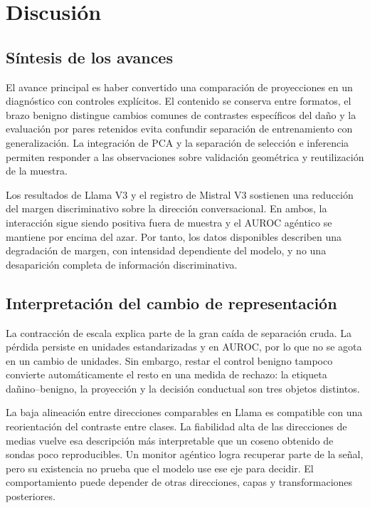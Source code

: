 \chapter{Discusión}
\label{chap:discusion}
\section{Síntesis de los avances}

El avance principal es haber convertido una comparación de proyecciones en un diagnóstico con controles explícitos. El contenido se conserva entre formatos, el brazo benigno distingue cambios comunes de contrastes específicos del daño y la evaluación por pares retenidos evita confundir separación de entrenamiento con generalización. La integración de PCA y la separación de selección e inferencia permiten responder a las observaciones sobre validación geométrica y reutilización de la muestra.

Los resultados de Llama V3 y el registro de Mistral V3 sostienen una reducción del margen discriminativo sobre la dirección conversacional. En ambos, la interacción sigue siendo positiva fuera de muestra y el AUROC agéntico se mantiene por encima del azar. Por tanto, los datos disponibles describen una degradación de margen, con intensidad dependiente del modelo, y no una desaparición completa de información discriminativa.

\section{Interpretación del cambio de representación}

La contracción de escala explica parte de la gran caída de separación cruda. La pérdida persiste en unidades estandarizadas y en AUROC, por lo que no se agota en un cambio de unidades. Sin embargo, restar el control benigno tampoco convierte automáticamente el resto en una medida de rechazo: la etiqueta dañino--benigno, la proyección y la decisión conductual son tres objetos distintos.

La baja alineación entre direcciones comparables en Llama es compatible con una reorientación del contraste entre clases. La fiabilidad alta de las direcciones de medias vuelve esa descripción más interpretable que un coseno obtenido de sondas poco reproducibles. Un monitor agéntico logra recuperar parte de la señal, pero su existencia no prueba que el modelo use ese eje para decidir. El comportamiento puede depender de otras direcciones, capas y transformaciones posteriores.

